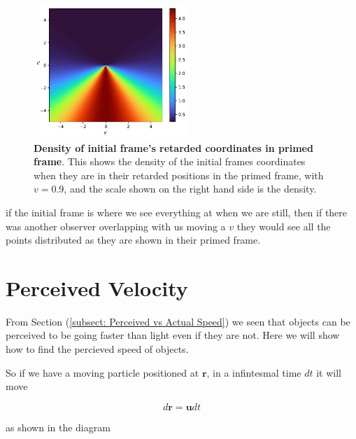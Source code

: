 \begin{figure}[H]
	\label{fig: retarded coordinate transform}
\end{figure}

\begin{figure}[H]
	\centering
	\includegraphics[height=5cm]{images/pdf/coord_transform_Retarded_Coordinate_Density_Transform.pdf}
	\caption{\textbf{Density of initial frame's retarded coordinates in primed frame}. This shows the density of the initial frames coordinates when they are in their retarded positions in the primed frame, with $v=0.9$, and the scale shown on the right hand side is the density.}
	\label{fig: Density of initial frame's retarded coordinates in primed frame}
\end{figure}

if the initial frame is where we see everything at when we are still, then if there was another observer overlapping with us moving a ${v}$ they would see all the points distributed as they are shown in their primed frame.

\section{Perceived Velocity} \label{sect: Perceived Velocity}

From Section (\ref{subsect: Perceived vs Actual Speed}) we seen that objects can be perceived to be going faster than light even if they are not.
Here we will show how to find the percieved speed of objects.

So if we have a moving particle positioned at $\mathbf{r}$, in a infintesmal time ${dt}$ it will move

\begin{equation}
	d\mathbf{r}= \mathbf{u} {dt}
\end{equation}

as shown in the diagram

